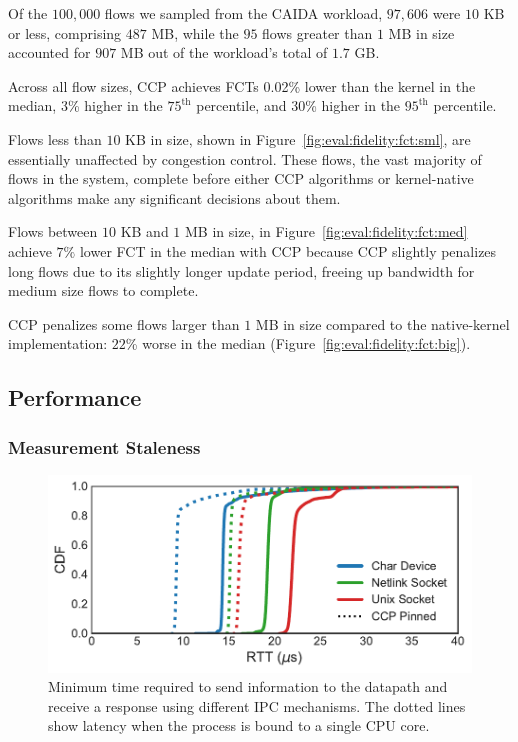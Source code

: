 Of the $100,000$ flows we sampled from the CAIDA workload, $97,606$ were $10$ KB or less, comprising $487$ MB, while the $95$ flows greater than $1$ MB in size accounted for $907$ MB out of the workload's total of $1.7$ GB. 

Across all flow sizes, CCP achieves FCTs 0.02\% lower than the kernel in the median, 3\% higher in the $75^{\text{th}}$ percentile, and $30$\% higher in the $95^{\text{th}}$ percentile.

 Flows less than $10$ KB in size, shown in Figure~\ref{fig:eval:fidelity:fct:sml}, are essentially unaffected by congestion control. These flows, the vast majority of flows in the system, complete before either CCP algorithms or kernel-native algorithms make any significant decisions about them. 

 Flows between $10$ KB and $1$ MB in size, in Figure~\ref{fig:eval:fidelity:fct:med}  achieve $7\%$ lower FCT in the median with CCP because CCP slightly penalizes long flows due to its slightly longer update period, freeing up bandwidth for medium size flows to complete.

 CCP penalizes some flows larger than $1$ MB in size compared to the native-kernel implementation: $22$\% worse in the median (Figure~\ref{fig:eval:fidelity:fct:big}). 

\subsection{Performance}
\label{sec:eval:whyfold}

\subsubsection{Measurement Staleness}
\label{sec:eval:whyfold:stale}
\begin{figure}[t]
\centering
    \includegraphics[width=\columnwidth]{img/ipc-latency}
    \caption{Minimum time required to send information to the datapath and receive a response using different IPC mechanisms. The dotted lines show latency when the process is bound to a single CPU core.}\label{fig:eval:ipc-latency}
\end{figure}


